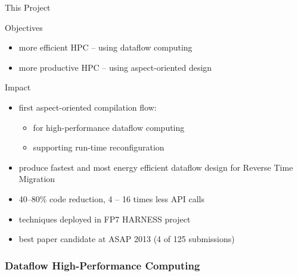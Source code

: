 \begin{frame}{This Project}
  \begin{beamerboxesrounded}{Objectives}
    \begin{itemize}
    \item more efficient HPC -- using dataflow computing
    \item more productive HPC -- using aspect-oriented design
    \end{itemize}
  \end{beamerboxesrounded}
  \vspace{0.3cm}
  \begin{beamerboxesrounded}{Impact}
    \begin{itemize}
      \item first aspect-oriented compilation flow:
      \begin{itemize}
      \item for high-performance dataflow computing
      \item supporting run-time reconfiguration
      \end{itemize}
    \item produce fastest and most energy efficient dataflow design for
      Reverse Time Migration
    \item 40--80\% code reduction, 4 -- 16 times less API calls
    \item techniques deployed in FP7 HARNESS project
    \item best paper candidate at ASAP 2013 (4 of 125 submissions)
    \end{itemize}
  \end{beamerboxesrounded}
\end{frame}

\begin{frame}
  \frametitle{Dataflow High-Performance Computing}
  \begin{figure}[!ht]
    \centering
    \def\svgwidth{0.9\linewidth}
    
  \end{figure}
\end{frame}

